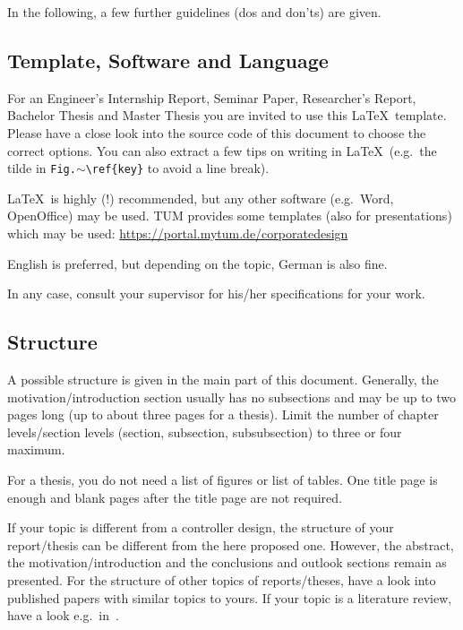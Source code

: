 \documentclass[journal]{IEEEtran}
\begin{document}

In the following, a few further guidelines (dos and don'ts) are given.

\subsection{Template, Software and Language}

For an Engineer's Internship Report, Seminar Paper, Researcher's Report, Bachelor Thesis and Master Thesis you are invited to use this \LaTeX\ template. Please have a close look into the source code of this document to choose the correct options. You can also extract a few tips on writing in \LaTeX\ (e.g.\ the tilde in \texttt{Fig.$\sim$\textbackslash{}ref\{key\}} to avoid a line break).

\LaTeX\ is highly (!) recommended, but any other software (e.g.\ Word, OpenOffice) may be used. TUM provides some templates (also for presentations) which may be used: \url{https://portal.mytum.de/corporatedesign}

English is preferred, but depending on the topic, German is also fine.

In any case, consult your supervisor for his/her specifications for your work.

\subsection{Structure}

A possible structure is given in the main part of this document. Generally, the motivation/introduction section usually has no subsections and may be up to two pages long (up to about three pages for a thesis). Limit the number of chapter levels/section levels (section, subsection, subsubsection) to three or four maximum.

For a thesis, you do not need a list of figures or list of tables. One title page is enough and blank pages after the title page are not required.

If your topic is different from a controller design, the structure of your report/thesis can be different from the here proposed one. However, the abstract, the motivation/introduction and the conclusions and outlook sections remain as presented. For the structure of other topics of reports/theses, have a look into published papers with similar topics to yours. If your topic is a literature review, have a look e.g.\ in~\cite{Cherubini2015Airborne}.
\end{document}
